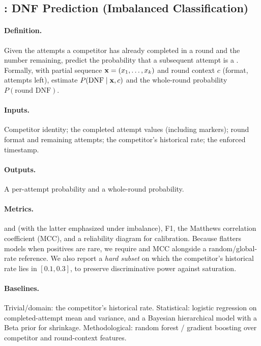 \subsection{: DNF Prediction (Imbalanced Classification)}
\label{sec:task3}

\paragraph{Definition.}
Given the attempts a competitor has already completed in a round and the
number remaining, predict the probability that a subsequent attempt is a
\DNF{}. Formally, with partial sequence
$\mathbf{x} = (x_1, \dots, x_{k})$ and round context $c$ (format, attempts left),
estimate $P(\text{DNF} \mid \mathbf{x}, c)$ and the whole-round probability
$P(\text{round DNF})$.

\paragraph{Inputs.}
Competitor identity; the completed attempt values (including \DNF{} markers);
round format and remaining attempts; the competitor's historical \DNF{} rate;
the enforced \asof{} timestamp.

\paragraph{Outputs.}
A per-attempt \DNF{} probability and a whole-round \DNF{} probability.

\paragraph{Metrics.}
\aucroc{} and \aucpr{} (with the latter emphasized under imbalance), F1, the
Matthews correlation coefficient (MCC), and a reliability diagram for
calibration. Because \aucroc{} flatters models when positives are rare, we
require \aucpr{} and MCC alongside a random/global-rate reference. We also
report a \emph{hard subset} on which the competitor's historical \DNF{} rate
lies in $[0.1, 0.3]$, to preserve discriminative power against saturation.

\paragraph{Baselines.}
Trivial/domain: the competitor's historical \DNF{} rate. Statistical:
logistic regression on completed-attempt mean and variance, and a Bayesian
hierarchical model with a Beta prior for shrinkage. Methodological: random
forest / gradient boosting over competitor and round-context features.

